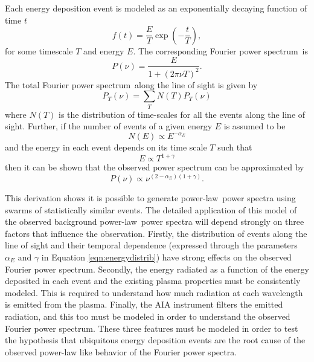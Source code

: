 \documentclass[preprint2]{aastex}
\newcommand{\PS}{power spectrum}
\newcommand{\PL}{power-law}
\newcommand{\Fps}{Fourier \PS}
\begin{document}
Each energy deposition event is modeled as an exponentially decaying
function of time $t$
\begin{equation}
\label{eqn:expdecay}
f(t) = \frac{E}{T}\exp\left(-\frac{t}{T}\right),
\end{equation}
for some timescale $T$ and energy $E$.  The corresponding \Fps\ is
\begin{equation}
\label{eqn:ftexpdecay}
P(\nu) = \frac{E}{1 + (2\pi \nu T)^{2}}.
\end{equation}
The total \Fps\ along the line of sight is given by
\begin{equation}
\label{eqn:sumftexpdecay}
P_{T}(\nu) = \sum_{T}N(T)P_{T}(\nu)
\end{equation}
where $N(T)$ is the distribution of time-scales for all the events
along the line of sight.  Further, if the number of events of a given
energy $E$ is assumed to be
\begin{equation}
\label{eqn:energydistrib}
N(E) \propto E^{-\alpha_{E}}
\end{equation}
and the energy in each event depends on its time scale $T$ such that
\begin{equation}
\label{eqn:energytime}
E \propto T^{1+\gamma}
\end{equation}
then it can be shown that the observed power spectrum can be
approximated by
\begin{equation}
\label{eqn:finalfps}
P(\nu) \propto \nu^{(2-\alpha_{E})(1+\gamma)}.
\end{equation}

This derivation shows it is possible to generate \PL\ power spectra
using swarms of statistically similar events.  The detailed
application of this model of the observed background \PL\ power
spectra will depend strongly on three factors that influence the
observation.  Firstly, the distribution of events along the line of
sight and their temporal dependence (expressed through the parameters
$\alpha_{E}$ and $\gamma$ in Equation \ref{eqn:energydistrib}) have
strong effects on the observed \Fps.  Secondly, the energy radiated as
a function of the energy deposited in each event and the existing
plasma properties must be consistently modeled.  This is required to
understand how much radiation at each wavelength is emitted from the
plasma.  Finally, the AIA instrument filters the emitted radiation,
and this too must be modeled in order to understand the observed \Fps.
These three features must be modeled in order to test the hypothesis
that ubiquitous energy deposition events are the root cause of the
observed power-law like behavior of the Fourier power spectra.
\end{document}
